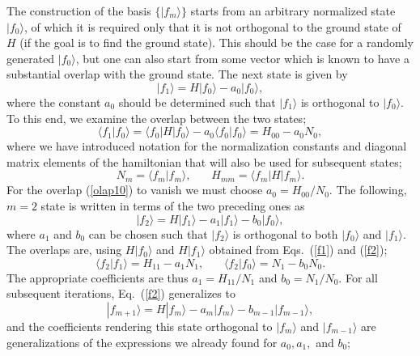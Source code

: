 \documentclass[draft,numberedheadings]{aipproc}
\begin{document}
The construction of the basis $\{ |f_m\rangle\}$ starts from an arbitrary normalized state $|f_0\rangle$, of which it is required 
only that it is not orthogonal to the ground state of $H$ (if the goal is to find the ground state). This should be the case for a randomly generated
$|f_0\rangle$, but one can also start from some vector which is known to have a substantial overlap with the ground state. The next state is given by
\begin{equation}
|f_1\rangle = H|f_0\rangle - a_0|f_0\rangle ,
\label{f1}
\end{equation}
where the constant $a_0$ should be determined such that $|f_1\rangle$ is orthogonal to $|f_0\rangle$. To this end, we examine the overlap between the two states;
\begin{equation}
\langle f_1|f_0\rangle = \langle f_0|H|f_0\rangle - a_0\langle f_0|f_0\rangle
= H_{00} - a_0N_0,
\label{olap10}
\end{equation}
where we have introduced notation for the normalization constants and diagonal matrix elements of the hamiltonian that will also be used for subsequent states;
\begin{equation}
N_m  = \langle f_m|f_m\rangle,~~~~~~~~H_{mm} = \langle f_m|H|f_m\rangle. \label{nmhm} 
\end{equation}
For the overlap (\ref{olap10}) to vanish we must choose $a_0 = H_{00}/N_0$. 
The following, $m=2$ state is written in terms of the two preceding ones as
\begin{equation}
|f_2\rangle = H|f_1\rangle - a_1|f_1\rangle - b_0|f_0\rangle ,
\label{f2}
\end{equation}
where $a_1$ and $b_0$ can be chosen such that $|f_2\rangle$ is orthogonal to both $|f_0\rangle$ and $|f_1\rangle$. The overlaps are, 
using $H|f_0\rangle$ and $H|f_1\rangle$ obtained from Eqs.~(\ref{f1}) and (\ref{f2});
\begin{equation}
\langle f_2|f_1\rangle = H_{11} - a_1N_1,~~~~~~~~
\langle f_2|f_0\rangle = N_1 - b_0N_0.
\end{equation}
The appropriate coefficients are thus $a_1 = H_{11}/N_1$ and $b_0 =  N_1/N_0$.
For all subsequent iterations, Eq.~(\ref{f2}) generalizes to
\begin{equation}
|f_{m+1}\rangle = H|f_m\rangle - a_m|f_m\rangle - b_{m-1}|f_{m-1}\rangle ,
\label{fn1}
\end{equation}
and the coefficients rendering this state orthogonal to $|f_{m}\rangle$ and $|f_{m-1}\rangle$ are generalizations of the expressions we already
found for $a_0,a_1,$ and $b_0$;
\end{document}

